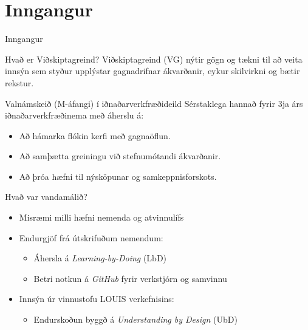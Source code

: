 \documentclass[
    NAME={Dr. Helga Ingimundardóttir},
    EMAIL={helgaingim@hi.is},
    FACULTY={Iðnaðarverkfræði},
    TITLE={Hagnýt hæfni í brennidepli},
    SUBTITLE={Endurskoðun á námskeiði í Viðskiptagreind},
    SEMINAR={Ráðstefna kennsluakademíunnar},
    DATE={22 nóvember, 2024},
    WIDE={true},
    ICELANDIC={true}
]{HI-LaTeX/hi-beamer}
\begin{document}
\section{Inngangur}
\begin{frame}{Inngangur}
    \begin{block}{Hvað er Viðskiptagreind?}
        Viðskiptagreind (VG) nýtir gögn og tækni til að veita innsýn sem styður upplýstar \alert{gagnadrifnar} ákvarðanir, eykur skilvirkni og bætir rekstur.
    \end{block}
    \vspace{0.5cm}
    \begin{block}{Valnámskeið (M-áfangi) í iðnaðarverkfræðideild}
        Sérstaklega hannað fyrir 3ja árs iðnaðarverkfræðinema með áherslu á:
        \begin{itemize}
            \item Að hámarka flókin kerfi með gagnaöflun.
            \item Að samþætta greiningu við stefnumótandi ákvarðanir.
            \item Að þróa hæfni til nýsköpunar og samkeppnisforskots.
        \end{itemize}
    \end{block}
\end{frame}


\begin{frame}{Hvað var vandamálið?}
    \begin{itemize}
        \item Misræmi milli hæfni nemenda og atvinnulífs
        \item Endurgjöf frá útskrifuðum nemendum:
        \begin{itemize}
            \item Áhersla á \textit{Learning-by-Doing} (LbD)
            \item Betri notkun á \textit{GitHub} fyrir verkstjórn og samvinnu
        \end{itemize}
        \item Innsýn úr vinnustofu LOUIS verkefnisins:
        \begin{itemize}
            \item Endurskoðun byggð á \textit{Understanding by Design} (UbD)
        \end{itemize}
    \end{itemize}
\end{frame}

\end{document}
